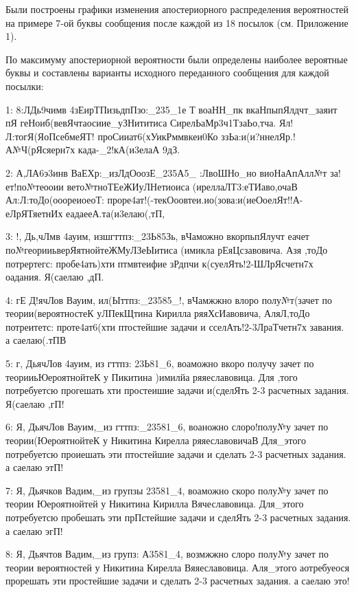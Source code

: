 Были построены графики изменения апостериорного распределения вероятностей на примере 7-ой буквы сообщения после каждой из 18 посылок (см. Приложение 1).

По максимуму апостериорной вероятности были определены наиболее вероятные буквы и составлены варианты исходного переданного сообщения для каждой посылки:

\vspace{0.5cm}

{ \scriptsize
1: 8:ЛДь9чимв 4зЕирТПизьдпПзо:\_235\_1е Т воаНН\_пк вкаНпыпЯлдчт\_заяит пЯ геНоиб(вевЯчтаосиие\_уЗНититиса СирелЬаМр3ч1ТзаЬо,тча. Ял!Л:тогЯ(ЯоПсебмеЯТ! проСииат6(хУикРммвкеи0Ко ззЬа:и(и?ннелЯр.!А№Ч(рЯсяерн7х када-\_2!кА(и3елаА 9дЗ.

2: А,ЛА6э3инв ВаЕХр:\_изЛдОоозЕ\_235А5\_ :ЛвоШНо\_но виоНаАпАлл№т за!ет!по№теооии вето№тноТЕеЖИуЛНетиоиса (иреллаЛТ3:еТИаво,очаВ Ал:Л:тоДо(ооореиоеоТ: проре4ат!(-текОоовтеи.ио(зова:и(иеОоелЯт!!А-еЛрЯТяетнИх еадаееА.та(и3елаю(,тП,

3: !, Дь,чЛмв 4ауим, изшгттпз:\_23Ь85Зь, вЧаможно вкорпьпЯлучт еачет по№георииьверЯятнойтеЖМуЛЗеЫитиса (имикла рЕяЦсзавовича. Азя ,тоДо потрертегс: пробе4ать)хти птмвтеифие зРдпчи к(суелЯть!2-ШЛрЯсчетн7х оадания. Я(саелаю ,дП.

4: гЕ Д!ячЛов Вауим, ил(Ыттпз:\_23585\_!, вЧамжжно влоро полу№т(зачет по теории(вероятностеК уЛПекЩтина Кирилла ряяХсИавовича, АляЛ,тоДо потреитетс: проте4ат6(хти птостейшие задачи и сселАть!2-3ЛраТчетн7х завания. а саелаю(.тПВ

5: г, ДьячЛов 4ауим, из гттпз: 23Ь81\_6, воаможно вкоро получу зачет по теорииьЮероятнойтеК у Пикитина )имилйа ряяеславовица. Для ,того потребуетсю прогешать хти простеишие задачи и(сделЯть 2-3 расчетных задания. Я(саелаю ,гП!

6: Я, ДьячЛов Вауим,\_из гттпз:\_23581\_6, воаножно слоро!полу№у зачет по теории(ЮероятнойтеК у Никитина Кирелла ряяеславовичаВ Для\_этого потребуетсю проиешать эти птостейшие задачи и сделать 2-3 расчетных задания. а саелаю этП!

7: Я, Дьячков Вадим,\_из групзы 23581\_4, воаможно скоро полу№у зачет по теории Юероятнойтей у Никитина Кирилла Вячеславовица. Для\_этого потребуетсю пробешать эти прПстейшие задачи и сделЯть 2-3 расчетных задания. а саелаю эгП!

8: Я, Дьячтов Вадим,\_из групз: А3581\_4, возмжжно слоро полу№у зачет по теории вероятностей у Никитина Кирелла Вяяеславовица. Аля\_этого аотребуеося прорешать эти простейшие задачи и сделать 2-3 расчетных задания. а саелаю это!

}
